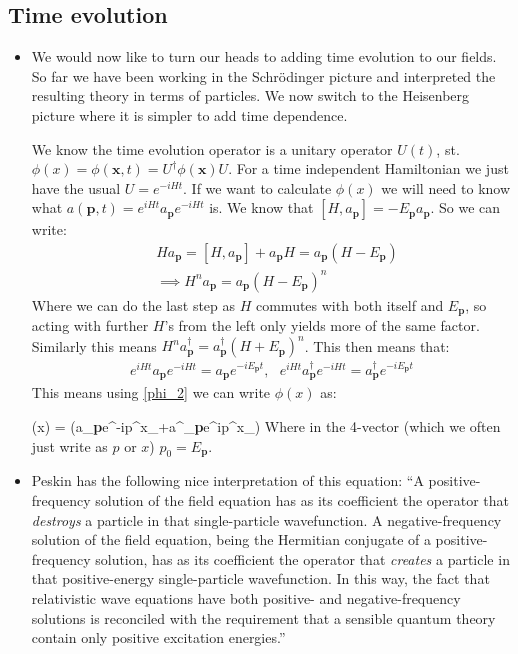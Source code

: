 \documentclass[11pt]{article}
\renewenvironment{flalign}{\vspace{-3mm}\empheq[box=\tcbhighmath]{align}}{\endempheq}
\numberwithin{equation}{section}
\begin{document}
\subsection{Time evolution}
\begin{itemize}
  \item We would now like to turn our heads to adding time evolution to our fields. So far we have been working in the Schr\"odinger picture and interpreted the resulting theory in terms of particles. We now switch to the Heisenberg picture where it is simpler to add time dependence. 

  We know the time evolution operator is a unitary operator $U(t)$, st. $\phi(x) = \phi(\textbf{x},t) = U^{\dagger}\phi(\textbf{x})U$. For a time independent Hamiltonian we just have the usual $U = e^{-iHt}$. If we want to calculate $\phi(x)$ we will need to know what $a(\textbf{p},t) = e^{iHt}a_{\textbf{p}}e^{-iHt}$ is. We know that $[H,a_{\textbf{p}}] = -E_{\textbf{p}}a_{\textbf{p}}$. So we can write:
  \begin{equation*}
  \begin{split}
  & Ha_{\textbf{p}} = [H,a_{\textbf{p}}]+a_{\textbf{p}}H = a_{\textbf{p}}(H-E_{\textbf{p}}) \\ 
  & \implies H^na_{\textbf{p}} = a_{\textbf{p}}(H-E_{\textbf{p}})^n
  \end{split} 
  \end{equation*}
  Where we can do the last step as $H$ commutes with both itself and $E_{\textbf{p}}$, so acting with further $H$'s from the left only yields more of the same factor. Similarly this means $H^na^{\dagger}_{\textbf{p}} = a^{\dagger}_{\textbf{p}}(H+E_{\textbf{p}})^n$. This then means that: 
\begin{align}
\label{a_H}
  e^{iHt}a_{\textbf{p}}e^{-iHt} = a_{\textbf{p}}e^{-iE_{\textbf{p}}t},~~~e^{iHt}a^{\dagger}_{\textbf{p}}e^{-iHt} = a^{\dagger}_{\textbf{p}}e^{-iE_{\textbf{p}}t}
\end{align}
  This means using \ref{phi_2} we can write $\phi(x)$ as:

  \begin{flalign}
  \label{phi_3}
  \phi(x) = \int {}\left(a_{\textbf{p}}e^{-ip^{\mu}x_{\mu}}+a^{\dagger}_{\textbf{p}}e^{ip^{\mu}x_{\mu}}\right) 
  \end{flalign}
  Where in the 4-vector (which we often just write as $p$ or $x$) $p_{0} = E_{\textbf{p}}$. 

  \item Peskin has the following nice interpretation of this equation: ``A positive-frequency solution of the field equation has as its coefficient the operator that \emph{destroys} a particle in that single-particle wavefunction. A negative-frequency solution of the field equation, being the Hermitian conjugate of a positive-frequency solution, has as its coefficient the operator that \emph{creates} a particle in that positive-energy single-particle wavefunction. In this way, the fact that relativistic wave equations have both positive- and negative-frequency solutions is reconciled with the requirement that a sensible quantum theory contain only positive excitation energies.'' 


\end{itemize}
\end{document}
